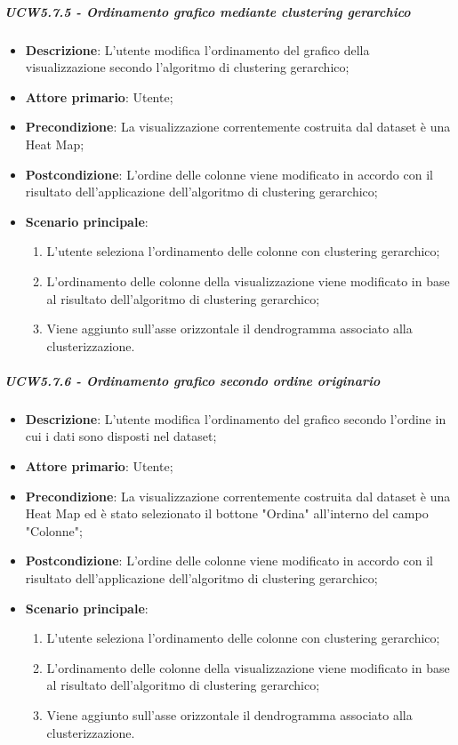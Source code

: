 \subparagraph{UCW5.7.5 - Ordinamento grafico mediante clustering gerarchico}
\label{spar:ucw5.7.5}
\begin{itemize}
    \item \textbf{Descrizione}:     L'utente modifica l'ordinamento del grafico  della visualizzazione secondo l'algoritmo di clustering gerarchico;
    \item \textbf{Attore primario}: Utente;
    \item \textbf{Precondizione}:   La visualizzazione correntemente costruita dal dataset è una Heat Map;
    \item \textbf{Postcondizione}:  L'ordine delle colonne viene modificato in accordo con il risultato dell'applicazione dell'algoritmo di clustering gerarchico;
    \item \textbf{Scenario principale}:
          \begin{enumerate}
              \item L'utente seleziona l'ordinamento delle colonne con clustering gerarchico;
              \item L'ordinamento delle colonne della visualizzazione viene modificato in base al risultato dell'algoritmo di clustering gerarchico;
              \item Viene aggiunto sull'asse orizzontale il dendrogramma associato alla clusterizzazione.
          \end{enumerate}
\end{itemize}

\subparagraph{UCW5.7.6 - Ordinamento grafico secondo ordine originario }
\label{spar:ucw5.7.6}
\begin{itemize}
    \item \textbf{Descrizione}:     L'utente modifica l'ordinamento del grafico secondo l'ordine in cui i dati sono disposti nel dataset;
    \item \textbf{Attore primario}: Utente;
    \item \textbf{Precondizione}:   La visualizzazione correntemente costruita dal dataset è una Heat Map ed è stato selezionato il bottone "Ordina" all'interno del campo "Colonne";
    \item \textbf{Postcondizione}:  L'ordine delle colonne viene modificato in accordo con il risultato dell'applicazione dell'algoritmo di clustering gerarchico;
    \item \textbf{Scenario principale}:
          \begin{enumerate}
              \item L'utente seleziona l'ordinamento delle colonne con clustering gerarchico;
              \item L'ordinamento delle colonne della visualizzazione viene modificato in base al risultato dell'algoritmo di clustering gerarchico;
              \item Viene aggiunto sull'asse orizzontale il dendrogramma associato alla clusterizzazione.
          \end{enumerate}
\end{itemize}



